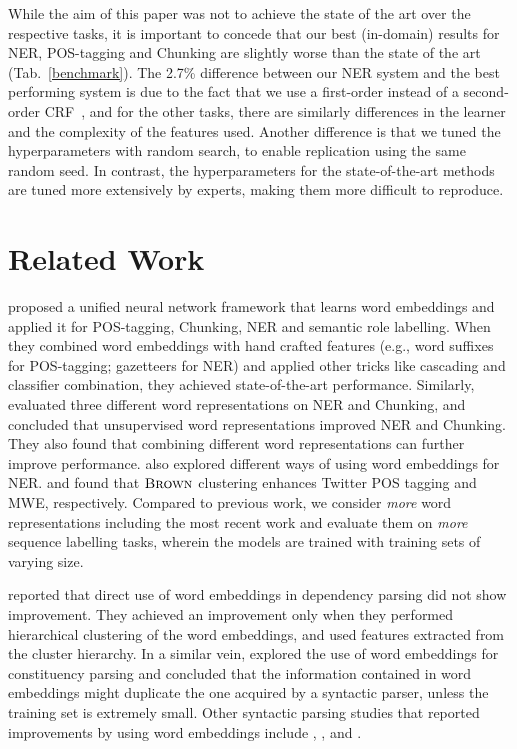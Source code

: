 \documentclass[11pt]{article}
\newcommand{\tabref}[2][]{Tab#1.~\ref{#2}\xspace}
\newcommand{\method}[2][]{\ensuremath{\textsc{#2#1}}\xspace}
\newcommand{\brown}[1][]{\method[\ensuremath{_{#1}}]{Brown}}
\newcommand{\task}[1]{\textsf{#1}\xspace}
\newcommand{\pos}{\task{POS-tagging}}
\newcommand{\chunking}{\task{Chunking}}
\newcommand{\ner}{\task{NER}}
\newcommand{\mwe}{\task{MWE}}
\begin{document}
While the aim of this paper was not to achieve the state of the art over
the respective tasks, it is important to concede that our best
(in-domain) results for \ner, \pos and \chunking are
slightly worse than the state of the art
(\tabref{benchmark}). The 2.7\% difference between our \ner system and
the best performing system is due to the fact that we use a first-order
instead of a second-order CRF~\cite{Ando:2005}, and for the other tasks,
there are similarly differences in the learner and the complexity of the
features used.
Another difference is that we tuned the hyperparameters with random
search, to enable replication using the same random seed.
In contrast, the hyperparameters for the state-of-the-art methods are
tuned more extensively by experts, making them more difficult to reproduce.



\section{Related Work}

 proposed a unified neural network framework
that learns word embeddings and applied it for \pos, \chunking, \ner and semantic role labelling. 
When they combined word embeddings with hand crafted features
(e.g., word suffixes for \pos;  gazetteers for \ner) and applied other
tricks like cascading and classifier combination, they achieved state-of-the-art performance.
Similarly,  evaluated three different word representations on \ner and \chunking, and concluded that unsupervised word representations improved \ner and \chunking. They also found that combining different word representations can further improve performance.  also explored different ways of using word embeddings for \ner.   and  found that \brown clustering enhances Twitter POS tagging and \mwe, respectively. Compared to previous work, we consider \textit{more} word representations including the most recent work and evaluate them on \textit{more} sequence labelling tasks, wherein the models are trained with training sets of varying size.

 reported that direct use of word embeddings in dependency parsing did not show improvement. They achieved an improvement only when they performed hierarchical clustering of the word embeddings, and used features extracted from the cluster hierarchy.
In a similar vein,  explored the use of word embeddings for constituency parsing and concluded that the
information contained in word embeddings might duplicate the one acquired by a
syntactic parser, unless the training set is extremely small.
Other syntactic parsing studies that reported improvements by using
word embeddings include , ,
 and .
\end{document}
